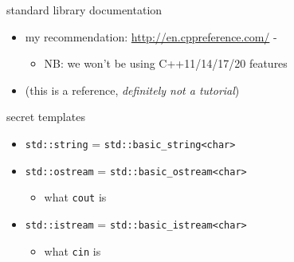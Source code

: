 \begin{frame}{standard library documentation}
    \begin{itemize}
    \item my recommendation: \url{http://en.cppreference.com/} -
        \begin{itemize}
        \item NB: we won't be using C++11/14/17/20 features
        \end{itemize}
    \item (this is a reference, \textit{definitely not a tutorial})
    \end{itemize}
\end{frame}

\begin{frame}[fragile,label=secTemp]{secret templates}
    \begin{itemize}
    \item \lstinline|std::string| = \lstinline|std::basic_string<char>|
    \item \lstinline|std::ostream| = \lstinline|std::basic_ostream<char>|
    \begin{itemize}\item what \texttt{cout} is\end{itemize}
    \item \lstinline|std::istream| = \lstinline|std::basic_istream<char>|
    \begin{itemize}\item what \texttt{cin} is\end{itemize}
    \end{itemize}
\end{frame}
